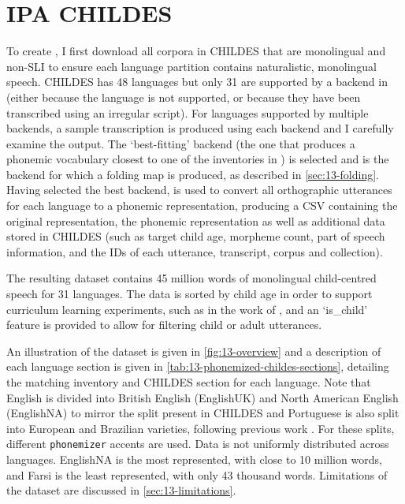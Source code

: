 
\section{IPA CHILDES}\label{sec:13-ipachildes}

To create \ipachildes, I first download all corpora in CHILDES that are monolingual and non-SLI to ensure each language partition contains naturalistic, monolingual speech. CHILDES has 48 languages but only 31 are supported by a backend in \gpp (either because the language is not supported, or because they have been transcribed using an irregular script). For languages supported by multiple backends, a sample transcription is produced using each backend and I carefully examine the output. The `best-fitting' backend (the one that produces a phonemic vocabulary closest to one of the inventories in \phoible) is selected and is the backend for which a folding map is produced, as described in \cref{sec:13-folding}. Having selected the best backend, \gpp is used to convert all orthographic utterances for each language to a phonemic representation, producing a CSV containing the original representation, the phonemic representation as well as additional data stored in CHILDES (such as target child age, morpheme count, part of speech information, and the IDs of each utterance, transcript, corpus and collection). 

The resulting dataset contains 45 million words of monolingual child-centred speech for 31 languages. The data is sorted by child age in order to support curriculum learning experiments, such as in the work of \citet{huebner-etal-2021-babyberta}, and an `is\_child' feature is provided to allow for filtering child or adult utterances.

An illustration of the dataset is given in \cref{fig:13-overview} and a description of each language section is given in \cref{tab:13-phonemized-childes-sections}, detailing the matching \phoible inventory and CHILDES section for each language. Note that English is divided into British English (EnglishUK) and North American English (EnglishNA) to mirror the split present in CHILDES and Portuguese is also split into European and Brazilian varieties, following previous work \citep{caines2019cross}. For these splits, different \texttt{phonemizer} accents are used. Data is not uniformly distributed across languages. EnglishNA is the most represented, with close to 10 million words, and Farsi is the least represented, with only 43 thousand words. Limitations of the dataset are discussed in \cref{sec:13-limitations}.

